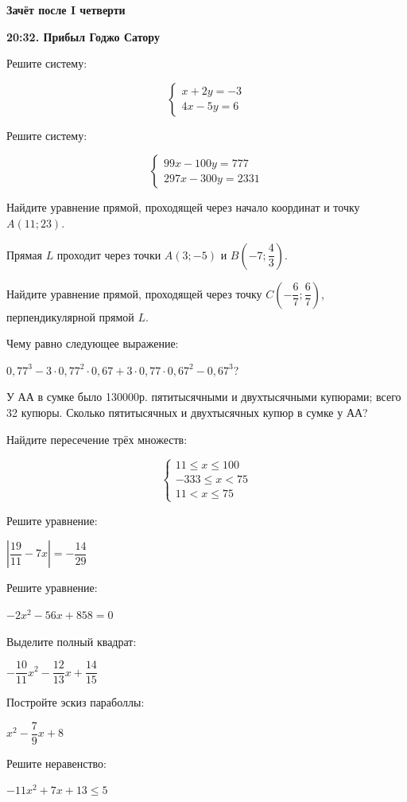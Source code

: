 \centerline{\bf \Huge Зачёт после I четверти}
\centerline{\bf \Huge }

\begin{flushright}
        \scriptsize{\textbf{20:32. Прибыл Годжо Сатору}}
\end{flushright}

 Решите систему:

\begin{equation*}
 \begin{cases}
   x + 2y = -3
   \\
   4x - 5y = 6
 \end{cases}
\end{equation*}

 Решите систему:

\begin{equation*}
 \begin{cases}
   99x - 100y = 777
   \\
   297x - 300y = 2331
 \end{cases}
\end{equation*}

 Найдите уравнение прямой, проходящей через начало координат и точку $A(11;23)$.

 Прямая $L$ проходит через точки $A(3;-5)$ и $B(-7;\dfrac{4}{3})$. 

Найдите уравнение прямой, проходящей через точку $C(-\dfrac{6}{7};\dfrac{6}{7})$, перпендикулярной прямой $L$.

 Чему равно следующее выражение: 

$0,77^3-3\cdot0,77^2\cdot0,67+3\cdot0,77\cdot0,67^2-0,67^3$?

 У АА в сумке было 130000р. пятитысячными и двухтысячными купюрами; всего 32 купюры. Сколько пятитысячных и двухтысячных купюр в сумке у АА?

 Найдите пересечение трёх множеств:

\begin{equation*}
 \begin{cases}
   11 \leqslant x  \leqslant 100
   \\
   -333 \leqslant x  < 75
   \\
    11 < x  \leqslant 75
 \end{cases}
\end{equation*}

 Решите уравнение: 

$\left|\dfrac{19}{11}-7x\right|=-\dfrac{14}{29}$

 Решите уравнение:

$-2x^2-56x+858=0$

 Выделите полный квадрат:

$-\dfrac{10}{11}x^2-\dfrac{12}{13}x+\dfrac{14}{15}$


 Постройте эскиз параболлы:

$x^2-\dfrac{7}{9}x+8$

 Решите неравенство:

$-11x^2+7x+13\leqslant5$



